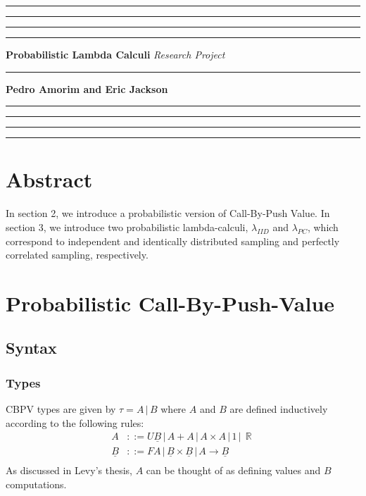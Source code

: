 \documentclass{article}
\DeclareMathOperator*\R{\mathbb{R}}
\newcommand{\1}{\mathsf{\,\#1\,}}
\newcommand{\2}{\mathsf{\,\#2\,}}
\newcommand{\B}{\underline{B}}
\begin{document}
	\hrule
	\smallskip
	\hrule\hrule\hrule
	\medskip
	\noindent
	{\huge \bf Probabilistic Lambda Calculi}
	\medskip
	\newline
	{\huge \it Research Project}

	\hrule
	\medskip
	\noindent
	{\Large \bf Pedro Amorim and Eric Jackson}
	\medskip
	\hrule\hrule\hrule
	\smallskip
	\hrule

\section{Abstract}

In section 2, we introduce a probabilistic version of Call-By-Push Value.
In section 3, we introduce two probabilistic lambda-calculi,
$\lambda_{IID}$ and $\lambda_{PC}$, which correspond to 
independent and identically distributed sampling 
and perfectly correlated sampling, respectively.

\section{Probabilistic Call-By-Push-Value}
\subsection{Syntax}
\subsubsection*{Types}
	CBPV types are given by $\tau = A \,|\, B$
	where $A$ and $B$ are defined inductively according to the following rules:
	\begin{equation*}
		\begin{split}
			A &::= 
			U \B
			\,|\, A + A
			\,|\, A \times A
			\,|\, 1			
			\,|\, \R \\
			\B &::=
			F A
			\,|\, \B \times \B
			\,|\, A \to \B \\
		\end{split}
	\end{equation*}
	As discussed in Levy's thesis,
	$A$ can be thought of as defining values
	and $B$ computations.
	
\end{document}
